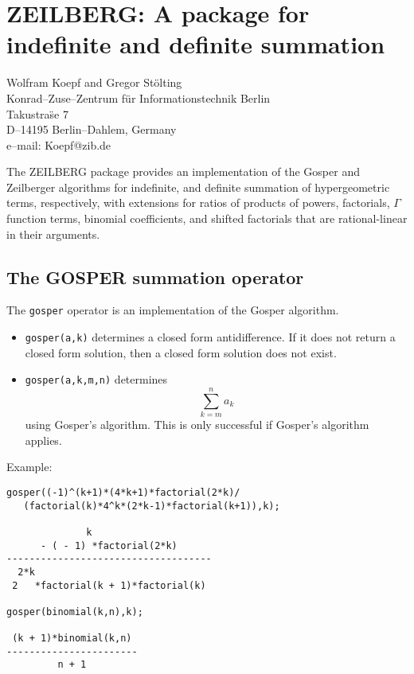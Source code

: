 \chapter[ZEILBERG: Indef \& definite summation]%
        {ZEILBERG: A package for indefinite and definite summation}
\label{ZEILBERG}

{\footnotesize
\begin{center}
Wolfram Koepf and Gregor St\"olting \\
Konrad--Zuse--Zentrum f\"ur Informationstechnik Berlin \\
Takustra\"se 7 \\
D--14195 Berlin--Dahlem, Germany \\[0.05in]
e--mail: Koepf@zib.de
\end{center}
}
\newcommand{\N} {{\rm {\mbox{\protect\makebox[.15em][l]{I}N}}}}


The ZEILBERG package provides an implementation of the Gosper and
Zeilberger algorithms for indefinite, and definite summation of
hypergeometric terms, respectively, with extensions for ratios of
products of powers, factorials, $\Gamma$ function terms, binomial
coefficients, and shifted factorials that are rational-linear in their
arguments.

\section{The GOSPER summation operator}

The {\tt gosper} operator is an implementation of the
Gosper algorithm. 
\begin{itemize}
\item
{\tt gosper(a,k)} determines a closed form antidifference.  If it does
not return a closed form solution, then a closed form solution does
not exist.
\item
{\tt gosper(a,k,m,n)} determines 
\[
\sum_{k=m}^n a_k
\]
using Gosper's algorithm.  This is only successful if Gosper's
algorithm applies. 
\end{itemize}

Example:

\begin{verbatim}
gosper((-1)^(k+1)*(4*k+1)*factorial(2*k)/
   (factorial(k)*4^k*(2*k-1)*factorial(k+1)),k);

              k
      - ( - 1) *factorial(2*k)
------------------------------------
  2*k
 2   *factorial(k + 1)*factorial(k)

gosper(binomial(k,n),k);

 (k + 1)*binomial(k,n)
-----------------------
         n + 1
\end{verbatim}

